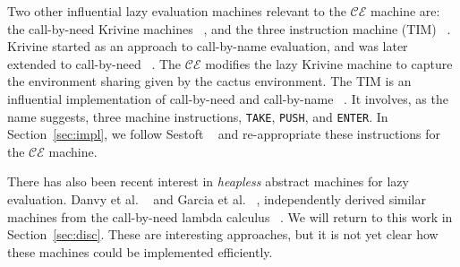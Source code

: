 Two other influential lazy evaluation machines relevant to the $\mathcal{CE}$
machine are: the call-by-need Krivine machines
~\cite{lkm,krivine2007call,sestoft}, and the three instruction machine (TIM)
~\cite{TIM}.  Krivine started as an approach to call-by-name evaluation, and was
later extended to call-by-need
~\cite{krivine2007call,sestoft,danvy2013synthetic,lkm}.  The $\mathcal{CE}$
modifies the lazy Krivine machine to capture the environment sharing given by
the cactus environment. The TIM is an influential
implementation of call-by-need and call-by-name ~\cite{TIM}.  It involves, as
the name suggests, three machine instructions, \texttt{TAKE}, \texttt{PUSH}, and
\texttt{ENTER}. In Section~\ref{sec:impl}, we follow Sestoft ~\cite{sestoft} and
re-appropriate these instructions for the $\mathcal{CE}$ machine.

There has also been recent interest in \emph{heapless} abstract
machines for lazy evaluation. Danvy et al. ~\cite{danvy2012inter} and
Garcia et al.  ~\cite{garcia2009lazy}, independently derived similar
machines from the call-by-need lambda calculus
~\cite{ariola1995call}. We will return to this work in
Section~\ref{sec:disc}.  These are interesting approaches, but it is
not yet clear how these machines could be implemented efficiently.
